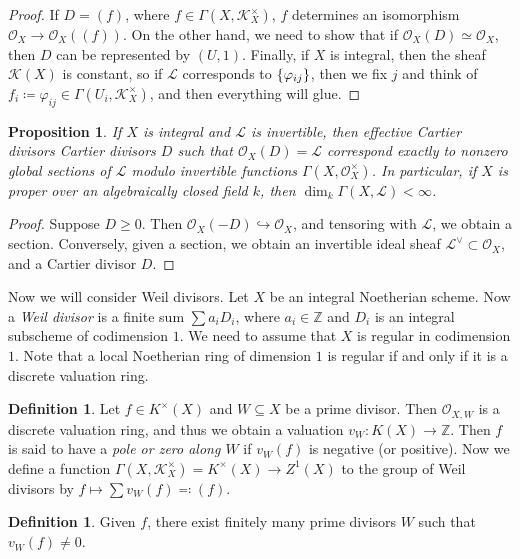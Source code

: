 \documentclass[leqno, openany]{memoir}
\newtheorem{prop}[thm]{Proposition}
\theoremstyle{definition}
\newtheorem{defn}[thm]{Definition}
\theoremstyle{remark}
\theoremstyle{plain}
\theoremstyle{definition}
\theoremstyle{remark}
\newcommand{\Z}{\mathbb{Z}}
\newcommand{\mc}[1]{\mathcal{#1}}
\begin{document}
\begin{proof}
    If $D = (f)$, where $f \in \Gamma(X, \mc{K}_X^{\times})$, $f$ determines an isomorphism $\mc{O}_X \to \mc{O}_X((f))$. On the other hand, we need to show that if $\mc{O}_X(D) \simeq \mc{O}_X$, then $D$ can be represented by $(U, 1)$. Finally, if $X$ is integral, then the sheaf $\mc{K}(X)$ is constant, so if $\mc{L}$ corresponds to $\qty{\varphi_{ij}}$, then we fix $j$ and think of $f_i \coloneqq \varphi_{ij} \in \Gamma(U_i, \mc{K}_X^{\times})$, and then everything will glue.
\end{proof}

\begin{prop}
    If $X$ is integral and $\mc{L}$ is invertible, then effective Cartier divisors Cartier divisors $D$ such that $\mc{O}_X(D) = \mc{L}$ correspond exactly to nonzero global sections of $\mc{L}$ modulo invertible functions $\Gamma(X, \mc{O}_X^{\times})$. In particular, if $X$ is proper over an algebraically closed field $k$, then $\dim_k \Gamma(X, \mc{L}) < \infty$.
\end{prop}

\begin{proof}
    Suppose $D \geq 0$. Then $\mc{O}_X(-D) \hookrightarrow \mc{O}_X$, and tensoring with $\mc{L}$, we obtain a section. Conversely, given a section, we obtain an invertible ideal sheaf $\mc{L}^{\vee} \subset \mc{O}_X$, and a Cartier divisor $D$.
\end{proof}

Now we will consider Weil divisors. Let $X$ be an integral Noetherian scheme. Now a \textit{Weil divisor} is a finite sum $\sum a_i D_i$, where $a_i \in \Z$ and $D_i$ is an integral subscheme of codimension $1$. We need to assume that $X$ is regular in codimension $1$. Note that a local Noetherian ring of dimension $1$ is regular if and only if it is a discrete valuation ring. 

\begin{defn}
    Let $f \in K^{\times}(X)$ and $W \subseteq X$ be a prime divisor. Then $\mc{O}_{X,W}$ is a discrete valuation ring, and thus we obtain a valuation $v_W \colon K(X) \to \Z$. Then $f$ is said to have a \textit{pole or zero along $W$} if $v_W(f)$ is negative (or positive). Now we define a function $\Gamma(X, \mc{K}_X^{\times}) = K^{\times}(X) \to Z^1(X)$ to the group of Weil divisors by $f \mapsto \sum v_W(f) \eqqcolon (f)$.
\end{defn}

\begin{defn}
    Given $f$, there exist finitely many prime divisors $W$ such that $v_W(f) \neq 0$.
\end{defn}
\end{document}
